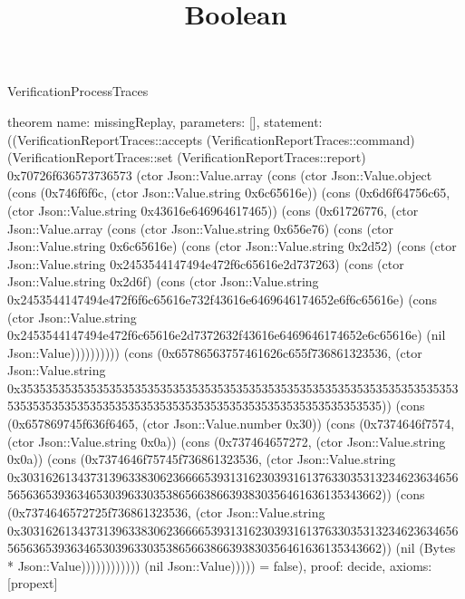 \begin{lexlean}{VerificationProcessTraces}
\title{Boolean}
\begin{semanticmodule}

theorem{
  name: missingReplay,
  parameters: [],
  statement: ((VerificationReportTraces::accepts (VerificationReportTraces::command) (VerificationReportTraces::set (VerificationReportTraces::report) 0x70726f636573736573 (ctor Json::Value.array (cons (ctor Json::Value.object (cons (0x746f6f6c, (ctor Json::Value.string 0x6c65616e)) (cons (0x6d6f64756c65, (ctor Json::Value.string 0x43616e646964617465)) (cons (0x61726776, (ctor Json::Value.array (cons (ctor Json::Value.string 0x656e76) (cons (ctor Json::Value.string 0x6c65616e) (cons (ctor Json::Value.string 0x2d52) (cons (ctor Json::Value.string 0x2453544147494e472f6c65616e2d737263) (cons (ctor Json::Value.string 0x2d6f) (cons (ctor Json::Value.string 0x2453544147494e472f6f6c65616e732f43616e6469646174652e6f6c65616e) (cons (ctor Json::Value.string 0x2453544147494e472f6c65616e2d7372632f43616e6469646174652e6c65616e) (nil Json::Value)))))))))) (cons (0x65786563757461626c655f736861323536, (ctor Json::Value.string 0x35353535353535353535353535353535353535353535353535353535353535353535353535353535353535353535353535353535353535353535353535353535)) (cons (0x657869745f636f6465, (ctor Json::Value.number 0x30)) (cons (0x7374646f7574, (ctor Json::Value.string 0x0a)) (cons (0x737464657272, (ctor Json::Value.string 0x0a)) (cons (0x7374646f75745f736861323536, (ctor Json::Value.string 0x30316261343731396338306236666539313162303931613763303531323462363465656563653936346530396330353865663866393830356461636135343662)) (cons (0x7374646572725f736861323536, (ctor Json::Value.string 0x30316261343731396338306236666539313162303931613763303531323462363465656563653936346530396330353865663866393830356461636135343662)) (nil (Bytes * Json::Value)))))))))))) (nil Json::Value))))) = false),
  proof: decide{},
  axioms: [propext]
}


\end{semanticmodule}
\end{lexlean}
